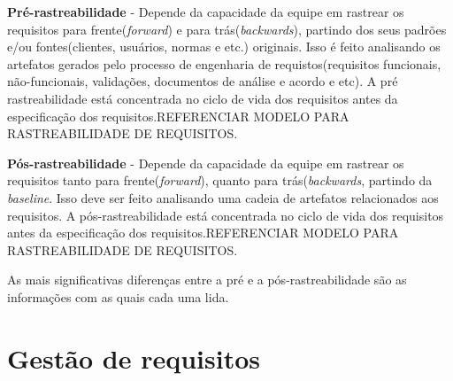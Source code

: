 \textbf{Pré-rastreabilidade} - Depende da capacidade da equipe em rastrear os requisitos para frente(\textit{forward}) e para trás(\textit{backwards}), partindo dos seus padrões e/ou fontes(clientes, usuários, normas e etc.) originais. Isso é feito analisando os artefatos gerados pelo processo de engenharia de requistos(requisitos funcionais, não-funcionais, validações, documentos de análise e acordo e etc). A pré rastreabilidade está concentrada no ciclo de vida dos requisitos antes da especificação dos requisitos.REFERENCIAR MODELO PARA RASTREABILIDADE DE REQUISITOS.

\textbf{Pós-rastreabilidade} - Depende da capacidade da equipe em rastrear os requisitos tanto para frente(\textit{forward}), quanto para trás(\textit{backwards}, partindo da \textit{baseline}. Isso deve ser feito analisando uma cadeia de artefatos relacionados aos requisitos. A pós-rastreabilidade está concentrada no ciclo de vida dos requisitos antes da especificação dos requisitos.REFERENCIAR MODELO PARA RASTREABILIDADE DE REQUISITOS.

As mais significativas diferenças entre a pré e a pós-rastreabilidade são as informações com as quais cada uma lida.

\section{Gestão de requisitos}